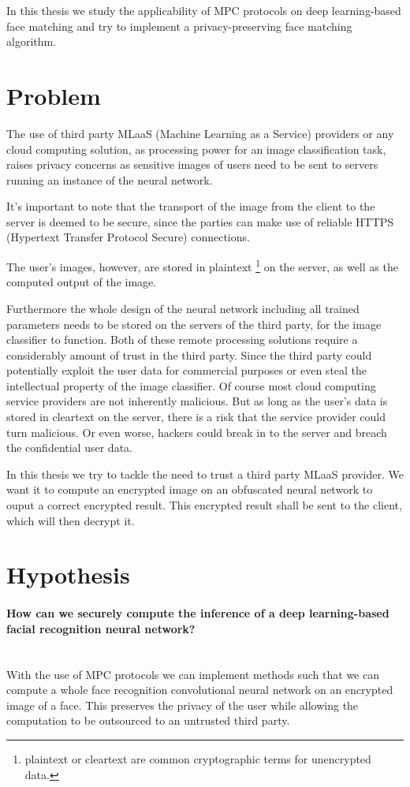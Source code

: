 In this thesis we study the applicability of MPC protocols on deep learning-based face matching and try to implement a privacy-preserving face matching algorithm.

\section{Problem}
The use of third party MLaaS (Machine Learning as a Service) providers or any cloud computing solution, as processing power for an image classification task, raises privacy concerns as sensitive images of users need to be sent to servers running an instance of the neural network.

It's important to note that the transport of the image from the client to the server is deemed to be secure, since the parties can make use of reliable HTTPS (Hypertext Transfer Protocol Secure) connections.

The user's images, however, are stored in plaintext \footnote{plaintext or cleartext are common cryptographic terms for unencrypted data.} on the server, as well as the computed output of the image.

Furthermore the whole design of the neural network including all trained parameters needs to be stored on the servers of the third party, for the image classifier to function. Both of these remote processing solutions require a considerably amount of trust in the third party. Since the third party could potentially exploit the user data for commercial purposes or even steal the intellectual property of the image classifier. Of course most cloud computing service providers are not inherently malicious. But as long as the user's data is stored in cleartext on the server, there is a risk that the service provider could turn malicious. Or even worse, hackers could break in to the server and breach the confidential user data.

In this thesis we try to tackle the need to trust a third party MLaaS provider. We want it to compute an encrypted image on an obfuscated neural network to ouput a correct encrypted result. This encrypted result shall be sent to the client, which will then decrypt it.

\section{Hypothesis}
\paragraph{How can we securely compute the inference of a deep learning-based facial recognition neural network?}\mbox{} \\
With the use of MPC protocols we can implement methods such that we can compute a whole face recognition convolutional neural network on an encrypted image of a face. This preserves the privacy of the user while allowing the computation to be outsourced to an untrusted third party.
